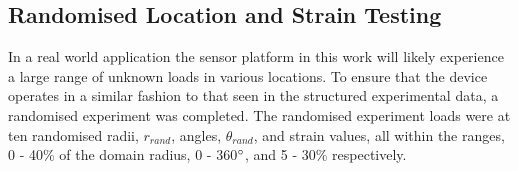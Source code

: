 


\subsection{Randomised Location and Strain Testing}
In a real world application the sensor platform in this work will likely experience a large range of unknown loads in various locations. To ensure that the device operates in a similar fashion to that seen in the structured experimental data, a randomised experiment was completed. The randomised experiment loads were at ten randomised radii, $r_{rand}$, angles, $\theta_{rand}$, and strain values, all within the ranges, 0 - 40\% of the domain radius, 0 - 360$\degree$, and  5 - 30\% respectively.

